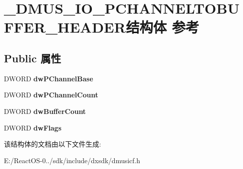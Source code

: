 \hypertarget{struct___d_m_u_s___i_o___p_c_h_a_n_n_e_l_t_o_b_u_f_f_e_r___h_e_a_d_e_r}{}\section{\+\_\+\+D\+M\+U\+S\+\_\+\+I\+O\+\_\+\+P\+C\+H\+A\+N\+N\+E\+L\+T\+O\+B\+U\+F\+F\+E\+R\+\_\+\+H\+E\+A\+D\+E\+R结构体 参考}
\label{struct___d_m_u_s___i_o___p_c_h_a_n_n_e_l_t_o_b_u_f_f_e_r___h_e_a_d_e_r}
\subsection*{Public 属性}
\begin{DoxyCompactItemize}
\item 
\mbox{\label{struct___d_m_u_s___i_o___p_c_h_a_n_n_e_l_t_o_b_u_f_f_e_r___h_e_a_d_e_r_aee0316523df90aa980ada60c0b0e18c9}} 
D\+W\+O\+RD {\bfseries dw\+P\+Channel\+Base}
\item 
\mbox{\label{struct___d_m_u_s___i_o___p_c_h_a_n_n_e_l_t_o_b_u_f_f_e_r___h_e_a_d_e_r_a4cb6748d2311f2bc62d462f4dbe33ebd}} 
D\+W\+O\+RD {\bfseries dw\+P\+Channel\+Count}
\item 
\mbox{\label{struct___d_m_u_s___i_o___p_c_h_a_n_n_e_l_t_o_b_u_f_f_e_r___h_e_a_d_e_r_aeac29fabb7c395975a9c665b7a4108ef}} 
D\+W\+O\+RD {\bfseries dw\+Buffer\+Count}
\item 
\mbox{\label{struct___d_m_u_s___i_o___p_c_h_a_n_n_e_l_t_o_b_u_f_f_e_r___h_e_a_d_e_r_a5e12e03751d290240670300a6174095a}} 
D\+W\+O\+RD {\bfseries dw\+Flags}
\end{DoxyCompactItemize}


该结构体的文档由以下文件生成\+:\begin{DoxyCompactItemize}
\item 
E\+:/\+React\+O\+S-\/0../sdk/include/dxsdk/dmusicf.\+h\end{DoxyCompactItemize}
